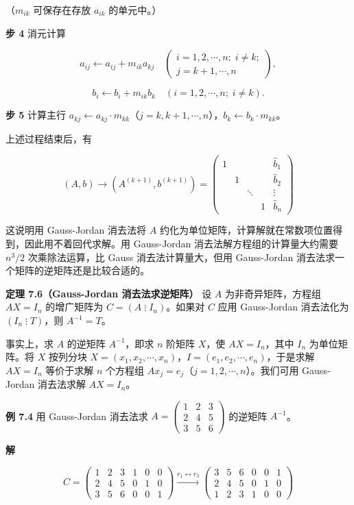 \documentclass[
  10pt,
  fontset=fandol]{ctexart}
\begin{document}
（\(m_{ik}\) 可保存在存放 \(a_{ik}\) 的单元中。）

\textbf{步 4} 消元计算

\[a_{ij}\leftarrow a_{ij}+m_{ik}a_{kj}\quad
\left(\begin{array}{l}i=1,2,\cdots,n;\;i\ne k;\\j=k+1,\cdots,n\end{array}\right),\]

\[b_i\leftarrow b_i+m_{ik}b_k\quad(i=1,2,\cdots,n;\;i\ne k).\]

\textbf{步 5} 计算主行 \(a_{kj}\leftarrow a_{kj}\cdot m_{kk}\)（\(j=k,k+1,\cdots,n\)），\(b_k\leftarrow b_k\cdot m_{kk}\)。

上述过程结束后，有

\[
(A,b)\to(A^{(k+1)},b^{(k+1)})=
\left(\begin{array}{cccc|c}
1&&&&\widehat{b}_1\\
&1&&&\widehat{b}_2\\
&&\ddots&&\vdots\\
&&&1&\widehat{b}_n
\end{array}\right)
\]

这说明用 Gauss-Jordan 消去法将 \(A\) 约化为单位矩阵，计算解就在常数项位置得到，因此用不着回代求解。用 Gauss-Jordan 消去法解方程组的计算量大约需要 \(n^3/2\) 次乘除法运算，比 Gauss 消去法计算量大，但用 Gauss-Jordan 消去法求一个矩阵的逆矩阵还是比较合适的。

\textbf{定理 7.6（Gauss-Jordan 消去法求逆矩阵）} 设 \(A\) 为非奇异矩阵，方程组 \(AX=I_n\) 的增广矩阵为 \(C=(A\mathbin{\vdots}I_n)\)。如果对 \(C\) 应用 Gauss-Jordan 消去法化为 \((I_n\mathbin{\vdots}T)\)，则 \(A^{-1}=T\)。

事实上，求 \(A\) 的逆矩阵 \(A^{-1}\)，即求 \(n\) 阶矩阵 \(X\)，使 \(AX=I_n\)，其中 \(I_n\) 为单位矩阵。将 \(X\) 按列分块 \(X=(x_1,x_2,\cdots,x_n)\)，\(I=(e_1,e_2,\cdots,e_n)\)，于是求解 \(AX=I_n\) 等价于求解 \(n\) 个方程组 \(Ax_j=e_j\)（\(j=1,2,\cdots,n\)）。我们可用 Gauss-Jordan 消去法求解 \(AX=I_n\)。

\textbf{例 7.4} 用 Gauss-Jordan 消去法求 \(A=\begin{pmatrix}1&2&3\\2&4&5\\3&5&6\end{pmatrix}\) 的逆矩阵 \(A^{-1}\)。

\textbf{解}

\[
C=\left(\begin{array}{rrr|rrr}
1&2&3&1&0&0\\
2&4&5&0&1&0\\
3&5&6&0&0&1
\end{array}\right)
\xrightarrow{r_1\leftrightarrow r_3}
\left(\begin{array}{rrr|rrr}
\boxed{3}&5&6&0&0&1\\
2&4&5&0&1&0\\
1&2&3&1&0&0
\end{array}\right)
\]
\end{document}
